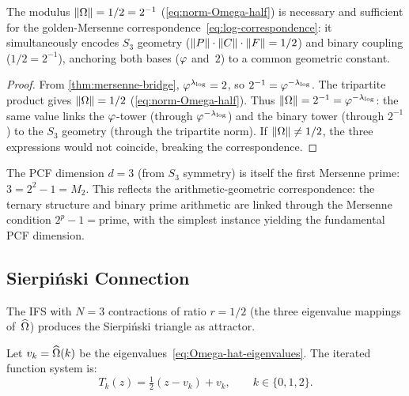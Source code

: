 \begin{Proposition}\label{prop:critical-mediator}
The modulus $\|\Omega\| = 1/2 = 2^{-1}$
(\cref{eq:norm-Omega-half}) is necessary and sufficient for the
golden-Mersenne correspondence~\cref{eq:log-correspondence}: it
simultaneously encodes $S_3$ geometry
($\|P\|\cdot\|C\|\cdot\|F\|=1/2$) and binary coupling
($1/2 = 2^{-1}$), anchoring both bases ($\varphi$ and~$2$) to a common
geometric constant.
\end{Proposition}

\begin{proof}
From \cref{thm:mersenne-bridge}, $\varphi^{\lambda_{\log}}=2$,
so $2^{-1} = \varphi^{-\lambda_{\log}}$.  The tripartite product gives
$\|\Omega\|=1/2$ (\cref{eq:norm-Omega-half}).  Thus
$\|\Omega\| = 2^{-1} = \varphi^{-\lambda_{\log}}$: the same value
links the $\varphi$-tower (through $\varphi^{-\lambda_{\log}}$) and the
binary tower (through $2^{-1}$) to the $S_3$ geometry (through the
tripartite norm).  If $\|\Omega\|\ne 1/2$, the three expressions would
not coincide, breaking the correspondence.
\end{proof}

\begin{Remark}[$d = 3 = M_2$]\label{rmk:d-equals-M2}
The PCF dimension $d=3$ (from $S_3$ symmetry) is itself the first
Mersenne prime: $3 = 2^2 - 1 = M_2$. This reflects the
arithmetic-geometric correspondence: the ternary structure and binary
prime arithmetic are linked through the Mersenne condition $2^p - 1 =
\text{prime}$, with the simplest instance yielding the fundamental
PCF dimension.
\end{Remark}


\subsection{Sierpi\'nski Connection}\label{ssec:sierpinski}

The IFS with $N=3$ contractions of ratio $r=1/2$ (the three eigenvalue
mappings of~$\widehat{\Omega}$) produces the Sierpi\'nski triangle as attractor.

\begin{Definition}\label{def:ifs}
Let $v_k = \widehat{\Omega}(k)$ be the eigenvalues~\cref{eq:Omega-hat-eigenvalues}.
The iterated function system is:
\begin{equation}\label{eq:ifs}
  T_k(z) = \tfrac{1}{2}(z - v_k) + v_k, \qquad k\in\{0,1,2\}.
\end{equation}
\end{Definition}


